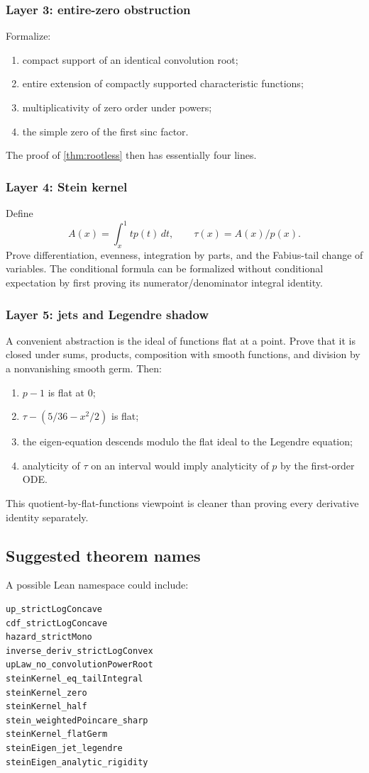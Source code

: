 \documentclass[11pt,oneside]{article}
\theoremstyle{definition}
\theoremstyle{remark}
\begin{document}
\subsubsection*{Layer 3: entire-zero obstruction}
Formalize:
\begin{enumerate}
\item compact support of an identical convolution root;
\item entire extension of compactly supported characteristic functions;
\item multiplicativity of zero order under powers;
\item the simple zero of the first sinc factor.
\end{enumerate}
The proof of \cref{thm:rootless} then has essentially four lines.

\subsubsection*{Layer 4: Stein kernel}
Define
\[
 A(x)=\int_x^1tp(t)\,dt,
 \qquad \tau(x)=A(x)/p(x).
\]
Prove differentiation, evenness, integration by parts, and the Fabius-tail change
of variables.  The conditional formula can be formalized without conditional
expectation by first proving its numerator/denominator integral identity.

\subsubsection*{Layer 5: jets and Legendre shadow}
A convenient abstraction is the ideal of functions flat at a point.  Prove that
it is closed under sums, products, composition with smooth functions, and division
by a nonvanishing smooth germ.  Then:
\begin{enumerate}
\item $p-1$ is flat at $0$;
\item $\tau-(5/36-x^2/2)$ is flat;
\item the eigen-equation descends modulo the flat ideal to the Legendre equation;
\item analyticity of $\tau$ on an interval would imply analyticity of $p$ by the
first-order ODE.
\end{enumerate}
This quotient-by-flat-functions viewpoint is cleaner than proving every derivative
identity separately.

\subsection{Suggested theorem names}
A possible Lean namespace could include:
\begin{lstlisting}[style=pseudo,breaklines=true]
up_strictLogConcave
cdf_strictLogConcave
hazard_strictMono
inverse_deriv_strictLogConvex
upLaw_no_convolutionPowerRoot
steinKernel_eq_tailIntegral
steinKernel_zero
steinKernel_half
stein_weightedPoincare_sharp
steinKernel_flatGerm
steinEigen_jet_legendre
steinEigen_analytic_rigidity
\end{lstlisting}
\end{document}
